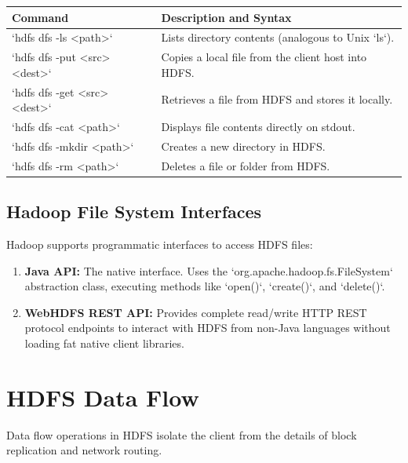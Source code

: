 \documentclass[12pt,a4paper]{article}
\renewcommand{\arraystretch}{1.45}
\begin{document}
\begin{tcolorbox}[examplebox, title={Common HDFS Terminal Commands}]
\renewcommand{\arraystretch}{1.3}
\begin{tabularx}{\linewidth}{|B{3.5cm}|Y|}
\hline
\textbf{Command} & \textbf{Description and Syntax} \\
\hline
`hdfs dfs -ls <path>` & Lists directory contents (analogous to Unix `ls`). \\
\hline
`hdfs dfs -put <src> <dest>` & Copies a local file from the client host into HDFS. \\
\hline
`hdfs dfs -get <src> <dest>` & Retrieves a file from HDFS and stores it locally. \\
\hline
`hdfs dfs -cat <path>` & Displays file contents directly on stdout. \\
\hline
`hdfs dfs -mkdir <path>` & Creates a new directory in HDFS. \\
\hline
`hdfs dfs -rm <path>` & Deletes a file or folder from HDFS. \\
\hline
\end{tabularx}
\end{tcolorbox}

\subsection{Hadoop File System Interfaces}
Hadoop supports programmatic interfaces to access HDFS files:
\begin{enumerate}[leftmargin=*, itemsep=3pt]
  \item \textbf{Java API:} The native interface. Uses the `org.apache.hadoop.fs.FileSystem` abstraction class, executing methods like `open()`, `create()`, and `delete()`.
  \item \textbf{WebHDFS REST API:} Provides complete read/write HTTP REST protocol endpoints to interact with HDFS from non-Java languages without loading fat native client libraries.
\end{enumerate}

\section{HDFS Data Flow}

Data flow operations in HDFS isolate the client from the details of block replication and network routing.
\end{document}
